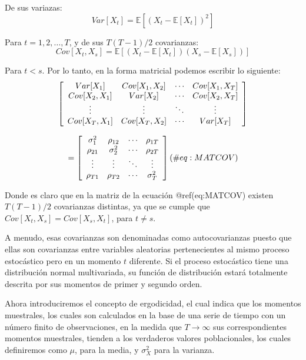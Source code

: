\documentclass[
  a4paper,
]{article}
\begin{document}
De sus variazas: \begin{equation*}
    Var[X_t] = \mathbb{E}[(X_t - \mathbb{E}[X_t])^2]
\end{equation*}

Para \(t = 1, 2, \ldots, T\), y de sus \(T(T-1)/2\) covarianzas:
\begin{equation*}
    Cov[X_t,X_s] = \mathbb{E}[(X_t - \mathbb{E}[X_t])(X_s - \mathbb{E}[X_s])]
\end{equation*}

Para \(t < s\). Por lo tanto, en la forma matricial podemos escribir lo
siguiente: \begin{equation*}
\left[
    \begin{array}{c c c c}
    Var[X_1] & Cov[X_1,X_2] & \cdots & Cov[X_1,X_T] \\
    Cov[X_2,X_1] & Var[X_2] & \cdots & Cov[X_2,X_T] \\
    \vdots & \vdots & \ddots & \vdots \\
    Cov[X_T,X_1] & Cov[X_T,X_2] & \cdots & Var[X_T] \\
    \end{array}
\right]
\end{equation*}

\[
= \left[
    \begin{array}{c c c c}
    \sigma_1^2 & \rho_{12} & \cdots & \rho_{1T} \\
    \rho_{21} & \sigma_2^2 & \cdots & \rho_{2T} \\
    \vdots & \vdots & \ddots & \vdots \\
    \rho_{T1} & \rho_{T2} & \cdots & \sigma_T^2 \\
    \end{array}
\right]
    (\#eq:MATCOV)
\]

Donde es claro que en la matriz de la ecuación @ref(eq:MATCOV) existen
\(T(T-1)/2\) covarianzas distintas, ya que se cumple que
\(Cov[X_t,X_s] = Cov[X_s,X_t]\), para \(t \neq s\).

A menudo, esas covarianzas son denominadas como autocovarianzas puesto
que ellas son covarianzas entre variables aleatorias pertenecientes al
mismo proceso estocástico pero en un momento \(t\) diferente. Si el
proceso estocástico tiene una distribución normal multivariada, su
función de distribución estará totalmente descrita por sus momentos de
primer y segundo orden.

Ahora introduciremos el concepto de ergodicidad, el cual indica que los
momentos muestrales, los cuales son calculados en la base de una serie
de tiempo con un número finito de observaciones, en la medida que
\(T \rightarrow \infty\) sus correspondientes momentos muestrales,
tienden a los verdaderos valores poblacionales, los cuales definiremos
como \(\mu\), para la media, y \(\sigma^2_X\) para la varianza.
\end{document}
